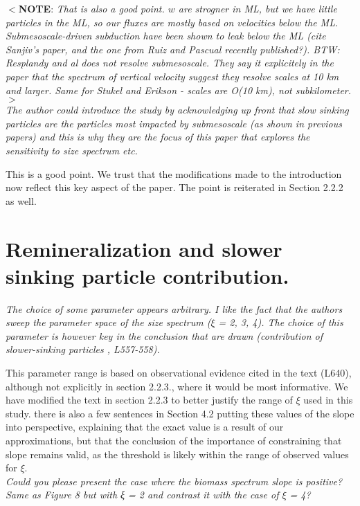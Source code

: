 \documentclass[12pt,letter]{article}
\newcommand{\note}[1]{\color{red}$<$\textbf{NOTE}: \textit{#1}$>$\color{black}}
\begin{document}
\note{That is also a good point. $w$ are strogner in ML, but we have little particles in the ML, so our fluxes are mostly based on velocities below the ML. Submesoscale-driven subduction have been shown to leak below the ML (cite Sanjiv's paper, and the one from Ruiz and Pascual recently published?). BTW: Resplandy and al does not resolve submesoscale. They say it explicitely in the paper that the spectrum of vertical velocity suggest they resolve scales at 10 km and larger. Same for Stukel and Erikson - scales are O(10 km), not subkilometer.}\\

\textit{The author could introduce the study by acknowledging up front that slow sinking particles are the particles most impacted by submesoscale (as shown in previous papers) and this is why they are the focus of this paper that explores the sensitivity to size spectrum etc.\\}

This is a good point. We trust that the modifications made to the introduction now reflect this key aspect of the paper. The point is reiterated in Section 2.2.2 as well.


\section*{Remineralization and slower sinking particle contribution.}
\textit{The choice of some parameter appears arbitrary. I like the fact that the authors sweep the parameter space of the size spectrum ($\xi$ = 2, 3, 4). The choice of this parameter is however key in the conclusion that are drawn (contribution of slower-sinking particles , L557-558).\\}

This parameter range is based on observational evidence cited in the text (L640), although not explicitly in section 2.2.3., where it would be most informative. We have modified the text in section 2.2.3 to better justify the range of $\xi$ used in this study. there is also a few sentences in Section 4.2 putting these values of the slope into perspective, explaining that the exact value is a result of our approximations, but that the conclusion of the importance of constraining that slope remains valid, as the threshold is likely within the range of observed values for $\xi$.\\

\textit{Could you please present the case where the biomass spectrum slope is positive? Same as Figure 8 but with ξ = 2 and contrast it with the case of $\xi$ = 4?\\}
\end{document}

